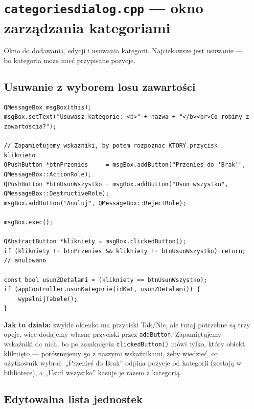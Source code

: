 \documentclass[11pt,a4paper]{article}
\begin{document}
\section{\texttt{categoriesdialog.cpp} --- okno zarządzania kategoriami}

Okno do dodawania, edycji i usuwania kategorii. Najciekawsze jest usuwanie ---
bo kategoria może mieć przypisane pozycje.

\subsection{Usuwanie z wyborem losu zawartości}

\begin{lstlisting}[caption={Własne przyciski i rozpoznanie, który kliknięto}]
QMessageBox msgBox(this);
msgBox.setText("Usuwasz kategorie: <b>" + nazwa + "</b><br>Co robimy z zawartoscia?");

// Zapamietujemy wskazniki, by potem rozpoznac KTORY przycisk kliknieto
QPushButton *btnPrzenies     = msgBox.addButton("Przenies do 'Brak'", QMessageBox::ActionRole);
QPushButton *btnUsunWszystko = msgBox.addButton("Usun wszystko",      QMessageBox::DestructiveRole);
msgBox.addButton("Anuluj", QMessageBox::RejectRole);

msgBox.exec();

QAbstractButton *klikniety = msgBox.clickedButton();
if (klikniety != btnPrzenies && klikniety != btnUsunWszystko) return;  // anulowano

const bool usunZDetalami = (klikniety == btnUsunWszystko);
if (appController.usunKategorie(idKat, usunZDetalami)) {
    wypelnijTabele();
}
\end{lstlisting}

\textbf{Jak to działa:} zwykłe okienko ma przyciski Tak/Nie, ale tutaj potrzebne
są trzy opcje, więc dodajemy własne przyciski przez \texttt{addButton}.
Zapamiętujemy wskaźniki do nich, bo po zamknięciu \texttt{clickedButton()} mówi
tylko, który obiekt kliknięto --- porównujemy go z naszymi wskaźnikami, żeby wiedzieć,
co użytkownik wybrał. „Przenieś do Brak” odpina pozycje od kategorii (zostają
w bibliotece), a „Usuń wszystko” kasuje je razem z kategorią.

\subsection{Edytowalna lista jednostek}
\end{document}
